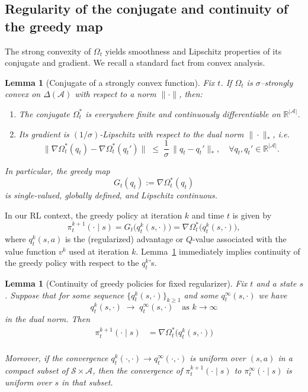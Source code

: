 \documentclass{article}
\theoremstyle{plain}
\newtheorem{lemma}[theorem]{Lemma}
\theoremstyle{definition}
\theoremstyle{remark}
\newcommand{\1}{\mathbbm{1}}
\begin{document}
\subsection{Regularity of the conjugate and continuity of the greedy map}

The strong convexity of $\Omega_t$ yields smoothness and Lipschitz properties of its conjugate and gradient. We recall a standard fact from convex analysis.

\begin{lemma}[Conjugate of a strongly convex function]
\label{lem:conjugate-regularity}
Fix $t$. If $\Omega_t$ is $\sigma$--strongly convex on $\Delta(\mathcal{A})$ with respect to a norm $\|\cdot\|$, then:
\begin{enumerate}
  \item The conjugate $\Omega_t^*$ is everywhere finite and continuously differentiable on $\mathbb{R}^{|\mathcal{A}|}$.
  \item Its gradient is $(1/\sigma)$-Lipschitz with respect to the dual norm $\|\cdot\|_*$, i.e.
  \[
  \big\|\nabla \Omega_t^*(q_t) - \nabla \Omega_t^*(q_t')\big\|
  \;\le\; \frac{1}{\sigma}\,\|q_t - q_t'\|_*,
  \quad \forall q_t,q_t'\in\mathbb{R}^{|\mathcal{A}|}.
  \]
\end{enumerate}
In particular, the greedy map
\[
G_t(q_t) := \nabla \Omega_t^*(q_t)
\]
is single-valued, globally defined, and Lipschitz continuous.
\end{lemma}

In our RL context, the greedy policy at iteration $k$ and time $t$ is given by
\[
\pi_t^{k+1}(\cdot \mid s)
= G_t\big(q_t^k(s,\cdot)\big)
= \nabla \Omega_t^*\big(q_t^k(s,\cdot)\big),
\]
where $q_t^k(s,a)$ is the (regularized) advantage or $Q$-value associated with the value function $v^k$ used at iteration $k$. Lemma~\ref{lem:conjugate-regularity} immediately implies continuity of the greedy policy with respect to the $q_t^k$'s.

\begin{lemma}[Continuity of greedy policies for fixed regularizer]
\label{lem:greedy-continuity}
Fix $t$ and a state $s$. Suppose that for some sequence $\{q_t^k(s,\cdot)\}_{k\ge1}$ and some $q_t^\infty(s,\cdot)$ we have
\[
q_t^k(s,\cdot) \;\longrightarrow\; q_t^\infty(s,\cdot)
\quad \text{as } k\to\infty
\]
in the dual norm. Then
\begin{align}
    \pi_t^{k+1}(\cdot \mid s)
    &= \nabla \Omega_t^*\big(q_t^k(s,\cdot)\big) \\
\end{align}

Moreover, if the convergence $q_t^k(\cdot,\cdot) \to q_t^\infty(\cdot,\cdot)$ is uniform over $(s,a)$ in a compact subset of $\mathcal{S}\times\mathcal{A}$, then the convergence of $\pi_t^{k+1}(\cdot\mid s)$ to $\pi_t^\infty(\cdot\mid s)$ is uniform over $s$ in that subset.
\end{lemma}
\end{document}
